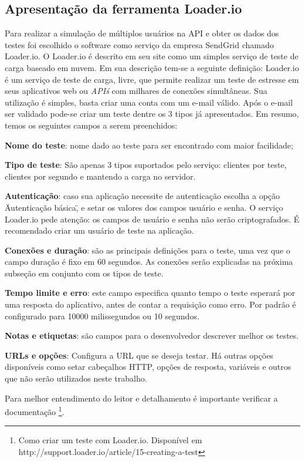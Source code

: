 \subsection{Apresentação da ferramenta Loader.io}

  Para realizar a simulação de múltiplos usuários na \ac{API} e obter os dados dos testes foi
  escolhido o software como serviço da empresa SendGrid chamado Loader.io. O Loader.io é descrito em seu site
   como um simples serviço de teste de carga baseado em nuvem. Em sua descrição tem-se a seguinte
  definição: Loader.io é um serviço de teste de carga, livre, que permite realizar um teste de estresse em
  seus aplicativos web ou \textit{API\'s} com milhares de conexões simultâneas. \cite{loaderio}
  Sua utilização é simples, basta criar uma conta com um e-mail válido. Após o e-mail ser validado pode-se
  criar um teste dentre os 3 tipos já apresentados. Em resumo, temos os seguintes campos a serem preenchidos:

  \textbf{Nome do teste}: nome dado ao teste para ser encontrado com maior facilidade;

  \textbf{Tipo de teste}: São apenas 3 tipos suportados pelo serviço: clientes por teste, clientes por segundo e mantendo
  a carga no servidor.

  \textbf{Autenticação}: caso sua aplicação necessite de autenticação escolha a opção \"Autenticação básica\",
  e setar os valores dos campos usuário e senha. O serviço Loader.io pede atenção:
  os campos de usuário e senha não serão criptografados. É recomendado criar um usuário de teste na aplicação.

  \textbf{Conexões e duração}: são as principais definições para o teste, uma vez que o campo duração
  é fixo em 60 segundos. As conexões serão explicadas na próxima subseção em conjunto com os tipos de teste.

  \textbf{Tempo limite e erro}: este campo especifica quanto tempo o teste esperará por uma resposta do aplicativo, antes
  de contar a requisição como erro. Por padrão é configurado para 10000 milissegundos ou 10 segundos.

  \textbf{Notas e etiquetas}: são campos para o desenvolvedor descrever  melhor os testes.

  \textbf{URLs e opções}: Configura a \ac{URL} que se deseja testar. Há outras opções disponíveis como setar cabeçalhos \ac{HTTP},
  opções de resposta, variáveis e outros que não serão utilizados neste trabalho.

  Para melhor entendimento do leitor e detalhamento é importante verificar
  a documentação \footnote[19]{Como criar um teste com Loader.io. Disponível em http://support.loader.io/article/15-creating-a-test}.

